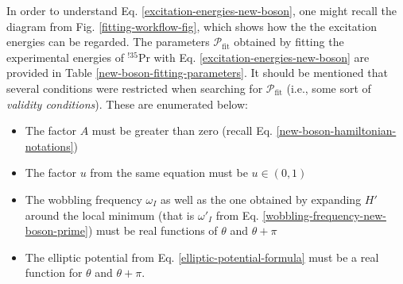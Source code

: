 In order to understand Eq. \ref{excitation-energies-new-boson}, one might recall the diagram from Fig. \ref{fitting-workflow-fig}, which shows how the the excitation energies can be regarded. The parameters $\mathcal{P}_\text{fit}$ obtained by fitting the experimental energies of $^{!35}$Pr with Eq. \ref{excitation-energies-new-boson} are provided in Table \ref{new-boson-fitting-parameters}. It should be mentioned that several conditions were restricted when searching for $\mathcal{P}_\text{fit}$ (i.e., some sort of \emph{validity conditions}). These are enumerated below:
\begin{itemize}
    \item The factor $A$ must be greater than zero (recall Eq. \ref{new-boson-hamiltonian-notations})
    \item The factor $u$ from the same equation must be $u\in(0,1)$
    \item The wobbling frequency $\omega_I$ as well as the one obtained by expanding $H'$ around the local minimum (that is $\omega'_I$ from Eq. \ref{wobbling-frequency-new-boson-prime}) must be real functions of $\theta$ and $\theta+\pi$
    \item The elliptic potential from Eq. \ref{elliptic-potential-formula} must be a real function for $\theta$ and $\theta+\pi$.
\end{itemize}
\begin{table}
    \centering
    \caption{The four free parameters obtained by fitting the experimental energies of $^{135}$Pr (taken from Ref. \cite{matta2017transverse}) using the set of energies from Eq. \ref{excitation-energies-new-boson}. For the moments of inertia, the unit is $\hbar^2\text{MeV}^{-1}$.}
    \label{new-boson-fitting-parameters}
\end{table}

